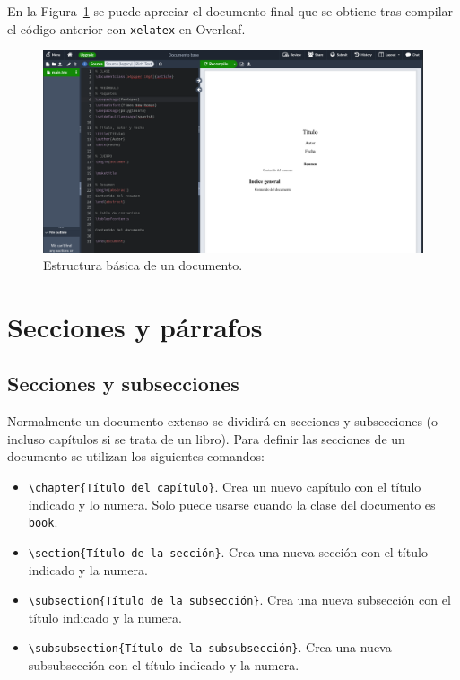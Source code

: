 \documentclass[
  letterpaper,
  DIV=11,
  numbers=noendperiod]{scrreport}
\providecommand{\tightlist}{%
  \setlength{\itemsep}{0pt}\setlength{\parskip}{0pt}}\usepackage{longtable,booktabs,array}
\begin{document}
En la Figura~\ref{fig-overleaf-documento-base} se puede apreciar el
documento final que se obtiene tras compilar el código anterior con
\texttt{xelatex} en Overleaf.

\begin{figure}

{\centering \includegraphics{./img/estructura/overleaf-documento-base.png}

}

\caption{\label{fig-overleaf-documento-base}Estructura básica de un
documento.}

\end{figure}


\hypertarget{secciones-y-puxe1rrafos}{%
\chapter{Secciones y párrafos}\label{secciones-y-puxe1rrafos}}

\hypertarget{secciones-y-subsecciones}{%
\section{Secciones y subsecciones}\label{secciones-y-subsecciones}}

Normalmente un documento extenso se dividirá en secciones y subsecciones
(o incluso capítulos si se trata de un libro). Para definir las
secciones de un documento se utilizan los siguientes comandos:

\begin{itemize}
\tightlist
\item
  \texttt{\textbackslash{}chapter\{Título\ del\ capítulo\}}. Crea un
  nuevo capítulo con el título indicado y lo numera. Solo puede usarse
  cuando la clase del documento es \texttt{book}.
\item
  \texttt{\textbackslash{}section\{Título\ de\ la\ sección\}}. Crea una
  nueva sección con el título indicado y la numera.
\item
  \texttt{\textbackslash{}subsection\{Título\ de\ la\ subsección\}}.
  Crea una nueva subsección con el título indicado y la numera.
\item
  \texttt{\textbackslash{}subsubsection\{Título\ de\ la\ subsubsección\}}.
  Crea una nueva subsubsección con el título indicado y la numera.
\end{itemize}
\end{document}
